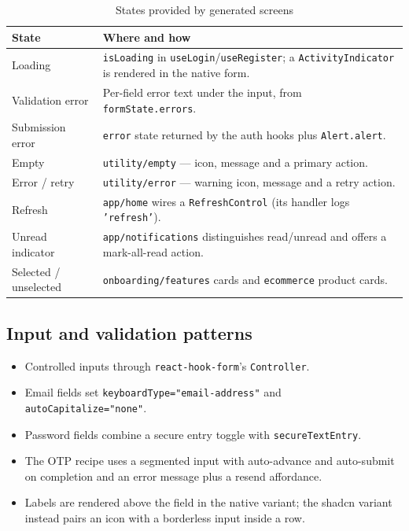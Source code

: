 \begin{longtable}{p{4cm}p{10.2cm}}
\caption{States provided by generated screens}\\
\toprule
\textbf{State} & \textbf{Where and how} \\
\midrule

Loading & \texttt{isLoading} in \texttt{useLogin}/\texttt{useRegister}; a
\texttt{ActivityIndicator} is rendered in the native form. \\
Validation error & Per-field error text under the input, from
\texttt{formState.errors}. \\
Submission error & \texttt{error} state returned by the auth hooks plus
\texttt{Alert.alert}. \\
Empty & \texttt{utility/empty} --- icon, message and a primary action. \\
Error / retry & \texttt{utility/error} --- warning icon, message and a retry action. \\
Refresh & \texttt{app/home} wires a \texttt{RefreshControl} (its handler logs
\texttt{'refresh'}). \\
Unread indicator & \texttt{app/notifications} distinguishes read/unread and offers a
mark-all-read action. \\
Selected / unselected & \texttt{onboarding/features} cards and
\texttt{ecommerce} product cards. \\
\bottomrule
\end{longtable}

\subsection*{Input and validation patterns}

\begin{itemize}
  \item Controlled inputs through \texttt{react-hook-form}'s \texttt{Controller}.
  \item Email fields set \texttt{keyboardType="email-address"} and
        \texttt{autoCapitalize="none"}.
  \item Password fields combine a secure entry toggle with
        \texttt{secureTextEntry}.
  \item The OTP recipe uses a segmented input with auto-advance and auto-submit on
        completion and an error message plus a resend affordance.
  \item Labels are rendered above the field in the native variant; the shadcn
        variant instead pairs an icon with a borderless input inside a row.
\end{itemize}

